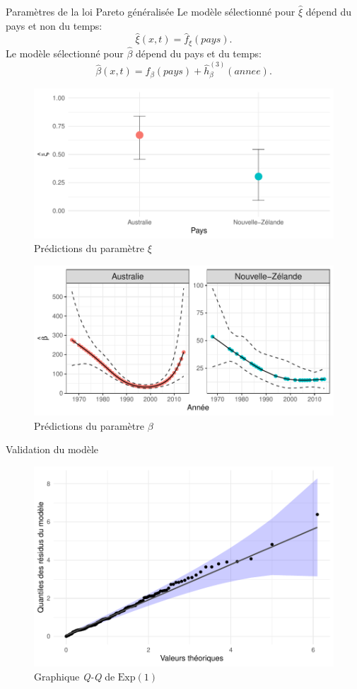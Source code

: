 \begin{frame}{Paramètres de la loi Pareto généralisée}
Le modèle sélectionné pour $\hat\xi$ dépend du pays et non du temps:
\begin{equation*}
\hat\xi(x,t) = \hat{f}_\xi(pays).
\end{equation*}
\pause
Le modèle sélectionné pour $\hat\beta$ dépend du pays et du temps:
\begin{equation*}
\hat\beta(x,t) = \hat{f}_\beta(pays) + \hat{h}^{(3)}_\beta(annee).
\end{equation*}
\end{frame}

\begin{frame}
\begin{figure}
\includegraphics[width=.8\textwidth]{images/fig-015.pdf}
\caption{Prédictions du paramètre $\xi$}
\end{figure}
\end{frame}


\begin{frame}
\begin{figure}
\includegraphics[width=.8\textwidth]{images/fig-016.pdf}
\caption{Prédictions du paramètre $\beta$}
\end{figure}
\end{frame}

\begin{frame}{Validation du modèle}
\begin{figure}
\includegraphics[width=.6\textwidth]{images/fig-018.pdf}
\caption{Graphique \textit{Q-Q} de $\text{Exp}(1)$}
\end{figure}
\end{frame}


